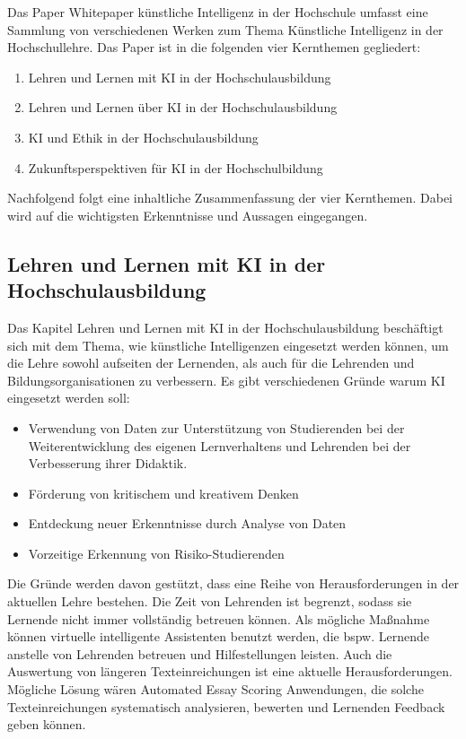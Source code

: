 
Das Paper \glqq{}Whitepaper künstliche Intelligenz in der Hochschule\grqq{} umfasst eine Sammlung von verschiedenen Werken zum Thema Künstliche Intelligenz in der Hochschullehre.
Das Paper ist in die folgenden vier Kernthemen gegliedert:
\begin{enumerate}
    \item Lehren und Lernen mit KI in der Hochschulausbildung
    \item Lehren und Lernen über KI in der Hochschulausbildung
    \item KI und Ethik in der Hochschulausbildung
    \item Zukunftsperspektiven für KI in der Hochschulbildung
\end{enumerate}
\noindent
Nachfolgend folgt eine inhaltliche Zusammenfassung der vier Kernthemen. Dabei wird auf die wichtigsten Erkenntnisse und Aussagen eingegangen.

\subsection{Lehren und Lernen mit KI in der Hochschulausbildung}
Das Kapitel \glqq{}Lehren und Lernen mit KI in der Hochschulausbildung\grqq{} beschäftigt sich mit dem Thema, wie künstliche Intelligenzen eingesetzt werden können, um die Lehre sowohl aufseiten der Lernenden, als auch für die Lehrenden und Bildungsorganisationen zu verbessern. Es gibt verschiedenen Gründe warum KI eingesetzt werden soll: \cite*[S. 11f]{Witt.2020}
\begin{itemize}
    \item Verwendung von Daten zur Unterstützung von Studierenden bei der Weiterentwicklung des eigenen Lernverhaltens und Lehrenden bei der Verbesserung ihrer Didaktik. \cite*[S. GENAUE SEITE]{Witt.2020}
    \item Förderung von kritischem und kreativem Denken \cite*[S. GENAUE SEITE]{Witt.2020}
    \item Entdeckung neuer Erkenntnisse durch Analyse von Daten \cite*[S. GENAUE SEITE]{Witt.2020}
    \item Vorzeitige Erkennung von Risiko-Studierenden \cite*[S. GENAUE SEITE]{Witt.2020}
\end{itemize}
\noindent
Die Gründe werden davon gestützt, dass eine Reihe von Herausforderungen in der aktuellen Lehre bestehen.
Die Zeit von Lehrenden ist begrenzt, sodass sie Lernende nicht immer vollständig betreuen können.
Als mögliche Maßnahme können virtuelle intelligente Assistenten benutzt werden, die bspw. Lernende anstelle von Lehrenden betreuen und Hilfestellungen leisten.
Auch die Auswertung von längeren Texteinreichungen ist eine aktuelle Herausforderungen.
Mögliche Lösung wären Automated Essay Scoring Anwendungen, die solche Texteinreichungen systematisch analysieren, bewerten und Lernenden Feedback geben können. \cite*[S. 12]{Witt.2020}


